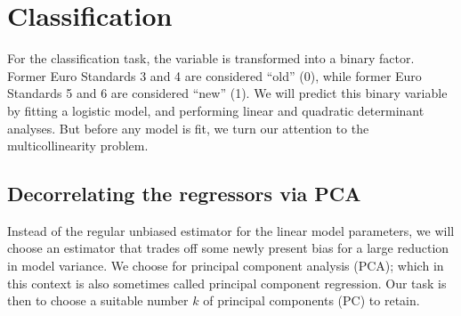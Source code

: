 \documentclass[a4paper, 12pt]{article}
\newcommand{\varr}[1]{\texttt{\StrSubstitute{#1}{ }{\_\allowbreak}}}
\begin{document}
\pagebreak
\section{Classification}
\FloatBarrier

For the classification task, the variable \varr{euro standard} is transformed into a binary factor. Former Euro Standards 3 and 4 are considered ``old'' (0), while former Euro Standards 5 and 6 are considered ``new'' (1). We will predict this binary variable by fitting a logistic model, and performing linear and quadratic determinant analyses. But before any model is fit, we turn our attention to the multicollinearity problem.

\subsection*{Decorrelating the regressors via PCA}

Instead of the regular unbiased estimator for the linear model parameters, we will choose an estimator that trades off some newly present bias for a large reduction in model variance. We choose for principal component analysis (PCA); which in this context is also sometimes called principal component regression. Our task is then to choose a suitable number $k$ of principal components (PC) to retain.
\end{document}
